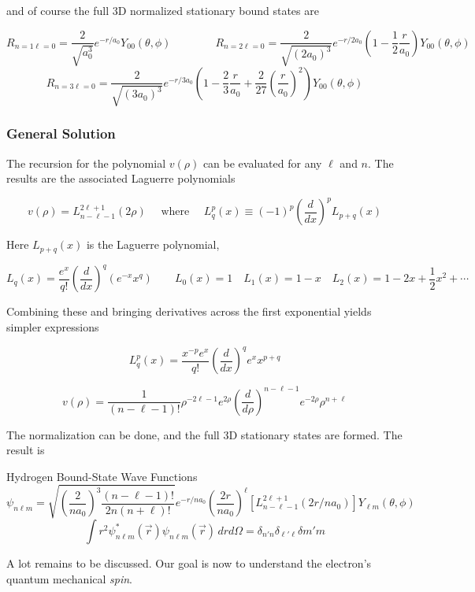 and of course the full 3D normalized stationary bound states are 

\[ R_{n=1\ell =0} = \frac{2}{\sqrt{a_0^3}}e^{-r / a_0} Y_{00} (\theta, \phi) \qquad \qquad R_{n=2
  \ell =0} = \frac{2}{\sqrt{(2a_0)^3}}e^{-r / 2a_0} \left( 1 - \frac{1}{2}
\frac{r}{a_0} \right)Y_{00} (\theta, \phi) \] 
\[ R_{n=3 \ell = 0} = \frac{2}{\sqrt{(3a_0)^3}}e^{-r / 3a_0} \left(
  1 - \frac{2}{3} \frac{r}{a_0} + \frac{2}{27} \left( \frac{r}{a_0} \right)^2
\right)Y_{00} (\theta, \phi)  \] \vspace{3px}



\subsubsection{General Solution}

The recursion for the polynomial $v(\rho)$ can be evaluated for any $\ell $ and
$n$. The results are the associated Laguerre polynomials 

\[
  v(\rho) = L_{n - \ell -1}^{2\ell +1} (2\rho) \quad \text{ where } \quad
  L_q^p(x) \equiv (-1)^p \left( \frac{d }{d x}  \right) ^p L_{p+q}(x) 
\] \vspace{3px}

Here $L_{p+q}(x)$ is the Laguerre polynomial, 

\[
  L_q(x) = \frac{e^x}{q!} \left( \frac{d }{d x}  \right) ^q (e^{-x} x^q) \qquad
  L_0(x) = 1 \quad L_1(x) = 1-x \quad L_2(x) = 1 - 2x + \frac{1}{2}x^2 + \cdots
\] \vspace{3px}

Combining these and bringing derivatives across the first exponential yields
simpler expressions

\[
  L_q^p(x) = \frac{x^{-p} e^x}{q!} \left( \frac{d }{d x}  \right) ^q e^x
x^{p+q} \]  

\[ v(\rho) = \frac{1}{(n - \ell - 1)!} \rho^{-2\ell - 1} e^{2\rho} \left(
\frac{d }{d \rho}  \right) ^{n - \ell - 1} e^{-2\rho} \rho^{n + \ell } \]
\vspace{3px}

The normalization can be done, and the full 3D stationary states are formed.
The result is 

\begin{subbox}{Hydrogen Bound-State Wave Functions}
  \[ \psi_{n\ell m} = \sqrt{ \left( \frac{2}{na_0} \right) ^3 \frac{(n - \ell
    - 1)!}{2n(n+\ell)! } }e^{-r / na_0} \left( \frac{2r}{na_0} \right) ^\ell
    \left[ L_{n - \ell -1}^{2\ell +1} (2r / na_0) \right] Y_{\ell m}(\theta,
    \phi) \] \[ \int r^2 \psi^*_{n\ell m}(\vec{r}) \psi_{n \ell m}(\vec{r}) \,
  dr d\Omega = \delta_{n'n}\delta_{\ell ' \ell } \delta{m'm} \] \vspace{3px}
\end{subbox}


A lot remains to be discussed. Our goal is now to understand the electron's quantum mechanical
\textit{spin}. 




